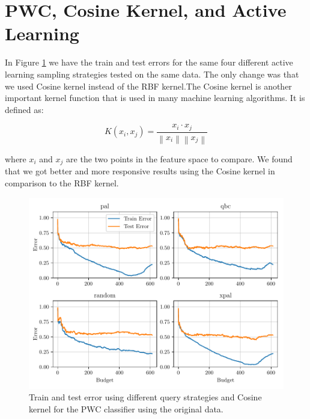 
\section{PWC, Cosine Kernel, and Active Learning}

In Figure \ref{fig:plot_all_results_cosine} we have the train and test errors for the same four different active learning sampling strategies tested on the same data. The only change was that we used Cosine kernel instead of the RBF kernel.The Cosine kernel is another important kernel function that is used in many machine learning algorithms. It is defined as:

\begin{equation}
    K(x_i, x_j) = \frac{x_i \cdot x_j}{\left\| x_i \right\| \left\| x_j \right\|}
\label{eq:cosine_kernel}
\end{equation}

where $x_i$ and $x_j$ are the two points in the feature space to compare. We found that we got better and more responsive results using the Cosine kernel in comparison to the RBF kernel.  

\begin{figure}[ht]
  \centering
  \includegraphics[width=\textwidth]{../img/plot_all_results_cosine_original_data}
  \caption{Train and test error using different query strategies and Cosine kernel for the PWC classifier using the original data.}
  \label{fig:plot_all_results_cosine}
\end{figure}


